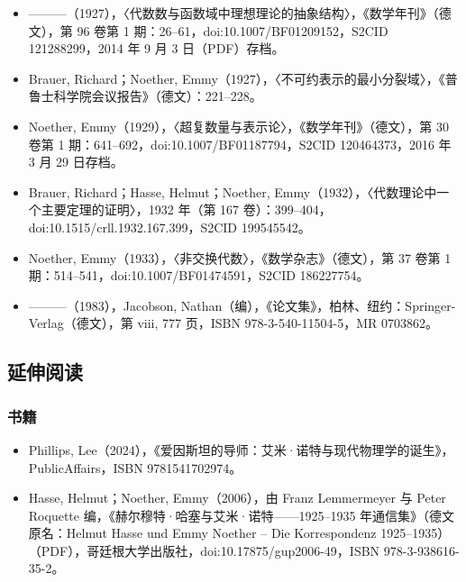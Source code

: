 \begin{itemize}
\item ———（1927），〈代数数与函数域中理想理论的抽象结构〉，《数学年刊》（德文），第 96 卷第 1 期：26–61，doi:10.1007/BF01209152，S2CID 121288299，2014 年 9 月 3 日（PDF）存档。
\item Brauer, Richard；Noether, Emmy（1927），〈不可约表示的最小分裂域〉，《普鲁士科学院会议报告》（德文）：221–228。
\item Noether, Emmy（1929），〈超复数量与表示论〉，《数学年刊》（德文），第 30 卷第 1 期：641–692，doi:10.1007/BF01187794，S2CID 120464373，2016 年 3 月 29 日存档。
\item Brauer, Richard；Hasse, Helmut；Noether, Emmy（1932），〈代数理论中一个主要定理的证明〉，1932 年（第 167 卷）：399–404，doi:10.1515/crll.1932.167.399，S2CID 199545542。
\item Noether, Emmy（1933），〈非交换代数〉，《数学杂志》（德文），第 37 卷第 1 期：514–541，doi:10.1007/BF01474591，S2CID 186227754。
\item ———（1983），Jacobson, Nathan（编），《论文集》，柏林、纽约：Springer-Verlag（德文），第 viii, 777 页，ISBN 978-3-540-11504-5，MR 0703862。
\end{itemize}
\subsection{延伸阅读}
\subsubsection{书籍}
\begin{itemize}
\item Phillips, Lee（2024），《爱因斯坦的导师：艾米·诺特与现代物理学的诞生》，PublicAffairs，ISBN 9781541702974。
\item Hasse, Helmut；Noether, Emmy（2006），由 Franz Lemmermeyer 与 Peter Roquette 编，《赫尔穆特·哈塞与艾米·诺特——1925–1935 年通信集》（德文原名：Helmut Hasse und Emmy Noether – Die Korrespondenz 1925–1935）（PDF），哥廷根大学出版社，doi:10.17875/gup2006-49，ISBN 978-3-938616-35-2。
\end{itemize}

